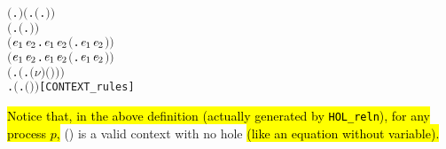 \begin{alltt}
\HOLTokenTurnstile{}  \ensuremath{(}\HOLTokenLambda{}. \ensuremath{)} \HOLSymConst{\HOLTokenConj{}} \ensuremath{(}\HOLSymConst{\HOLTokenForall{}}.  \ensuremath{(}\HOLTokenLambda{}. \ensuremath{)}\ensuremath{)} \HOLSymConst{\HOLTokenConj{}}
   \ensuremath{(}\HOLSymConst{\HOLTokenForall{}} .   \HOLSymConst{\HOLTokenImp{}}  \ensuremath{(}\HOLTokenLambda{}. \HOLSymConst{\ensuremath{\ldotp}} \ensuremath{)}\ensuremath{)} \HOLSymConst{\HOLTokenConj{}}
   \ensuremath{(}\HOLSymConst{\HOLTokenForall{}}\ensuremath{\HOLBoundVar{e}\sb{\mathrm{1}}} \ensuremath{\HOLBoundVar{e}\sb{\mathrm{2}}}.  \ensuremath{\HOLBoundVar{e}\sb{\mathrm{1}}} \HOLSymConst{\HOLTokenConj{}}  \ensuremath{\HOLBoundVar{e}\sb{\mathrm{2}}} \HOLSymConst{\HOLTokenImp{}}  \ensuremath{(}\HOLTokenLambda{}. \ensuremath{\HOLBoundVar{e}\sb{\mathrm{1}}}  \HOLSymConst{\ensuremath{+}} \ensuremath{\HOLBoundVar{e}\sb{\mathrm{2}}} \ensuremath{)}\ensuremath{)} \HOLSymConst{\HOLTokenConj{}}
   \ensuremath{(}\HOLSymConst{\HOLTokenForall{}}\ensuremath{\HOLBoundVar{e}\sb{\mathrm{1}}} \ensuremath{\HOLBoundVar{e}\sb{\mathrm{2}}}.  \ensuremath{\HOLBoundVar{e}\sb{\mathrm{1}}} \HOLSymConst{\HOLTokenConj{}}  \ensuremath{\HOLBoundVar{e}\sb{\mathrm{2}}} \HOLSymConst{\HOLTokenImp{}}  \ensuremath{(}\HOLTokenLambda{}. \ensuremath{\HOLBoundVar{e}\sb{\mathrm{1}}}  \HOLSymConst{\ensuremath{\mid}} \ensuremath{\HOLBoundVar{e}\sb{\mathrm{2}}} \ensuremath{)}\ensuremath{)} \HOLSymConst{\HOLTokenConj{}}
   \ensuremath{(}\HOLSymConst{\HOLTokenForall{}} .   \HOLSymConst{\HOLTokenImp{}}  \ensuremath{(}\HOLTokenLambda{}. \ensuremath{(\nu}\ensuremath{)} \ensuremath{(} \ensuremath{)}\ensuremath{)}\ensuremath{)} \HOLSymConst{\HOLTokenConj{}}
   \HOLSymConst{\HOLTokenForall{}} .   \HOLSymConst{\HOLTokenImp{}}  \ensuremath{(}\HOLTokenLambda{}.  \ensuremath{(} \ensuremath{)} \ensuremath{)}\hfill{[CONTEXT_rules]}
\end{alltt}
\hl{Notice that, in the above definition (actually generated by
\texttt{HOL_reln}), for any process $p$,} () is a
valid context with no hole \hl{(like an equation without variable).}

